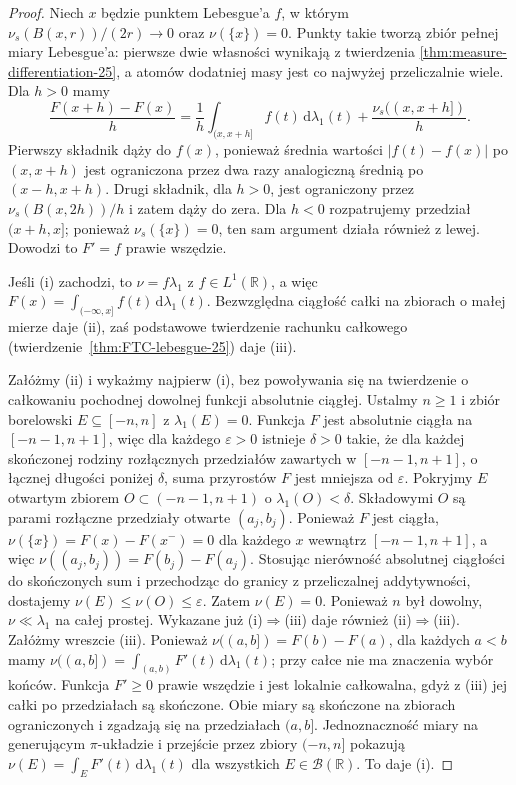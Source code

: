 \documentclass[11pt,a4paper,oneside]{book}
\numberwithin{equation}{chapter}
\theoremstyle{plain}
\theoremstyle{definition}
\theoremstyle{remark}
\begin{document}
\begin{proof}
Niech $x$ będzie punktem Lebesgue'a $f$, w którym
$\nu_s(B(x,r))/(2r)\to0$ oraz $\nu(\{x\})=0$.
Punkty takie tworzą zbiór pełnej miary Lebesgue'a:
pierwsze dwie własności wynikają z twierdzenia
\ref{thm:measure-differentiation-25}, a atomów dodatniej
masy jest co najwyżej przeliczalnie wiele.
Dla $h>0$ mamy
\[
 \frac{F(x+h)-F(x)}h
 =\frac1h\int_{(x,x+h]}f(t)\,\mathrm d\lambda_1(t)
 +\frac{\nu_s((x,x+h])}h.
\]
Pierwszy składnik dąży do $f(x)$, ponieważ średnia
wartości $|f(t)-f(x)|$ po $(x,x+h)$ jest ograniczona
przez dwa razy analogiczną średnią po $(x-h,x+h)$.
Drugi składnik, dla $h>0$, jest ograniczony przez
$\nu_s(B(x,2h))/h$ i zatem dąży do zera.
Dla $h<0$ rozpatrujemy przedział $(x+h,x]$;
ponieważ $\nu_s(\{x\})=0$, ten sam argument działa
również z lewej. Dowodzi to $F'=f$ prawie wszędzie.

Jeśli (i) zachodzi, to $\nu=f\lambda_1$ z
$f\in L^1(\mathbb R)$, a więc
$F(x)=\int_{(-\infty,x]}f(t)\,\mathrm d\lambda_1(t)$.
Bezwzględna ciągłość całki na zbiorach o małej mierze
daje (ii), zaś podstawowe twierdzenie rachunku
całkowego (twierdzenie~\ref{thm:FTC-lebesgue-25})
daje (iii).

Załóżmy (ii) i wykażmy najpierw (i), bez powoływania
się na twierdzenie o całkowaniu pochodnej dowolnej funkcji
absolutnie ciągłej. Ustalmy $n\ge1$ i zbiór borelowski
$E\subseteq[-n,n]$ z $\lambda_1(E)=0$. Funkcja $F$
jest absolutnie ciągła na $[-n-1,n+1]$, więc dla
każdego $\varepsilon>0$ istnieje $\delta>0$ takie,
że dla każdej skończonej rodziny rozłącznych przedziałów
zawartych w $[-n-1,n+1]$, o łącznej długości poniżej
$\delta$, suma przyrostów $F$ jest mniejsza od
$\varepsilon$. Pokryjmy $E$ otwartym zbiorem
$O\subset(-n-1,n+1)$ o $\lambda_1(O)<\delta$.
Składowymi $O$ są parami rozłączne przedziały otwarte
$(a_j,b_j)$. Ponieważ $F$ jest ciągła,
$\nu(\{x\})=F(x)-F(x^-)=0$ dla każdego $x$
wewnątrz $[-n-1,n+1]$, a więc
$\nu((a_j,b_j))=F(b_j)-F(a_j)$.
Stosując nierówność absolutnej ciągłości do skończonych
sum i przechodząc do granicy z przeliczalnej addytywności,
dostajemy $\nu(E)\le\nu(O)\le\varepsilon$.
Zatem $\nu(E)=0$. Ponieważ $n$ był dowolny,
$\nu\ll\lambda_1$ na całej prostej. Wykazane już
(i)$\Rightarrow$(iii) daje również (ii)$\Rightarrow$(iii).
Załóżmy wreszcie (iii). Ponieważ
$\nu((a,b])=F(b)-F(a)$, dla każdych $a<b$ mamy
$\nu((a,b])=\int_{(a,b)}F'(t)\,\mathrm d\lambda_1(t)$;
przy całce nie ma znaczenia wybór końców.
Funkcja $F'\ge0$ prawie wszędzie i jest lokalnie
całkowalna, gdyż z (iii) jej całki po przedziałach
są skończone. Obie miary są skończone na zbiorach
ograniczonych i zgadzają się na przedziałach $(a,b]$.
Jednoznaczność miary na generującym $\pi$-układzie
i przejście przez zbiory $(-n,n]$ pokazują
$\nu(E)=\int_EF'(t)\,\mathrm d\lambda_1(t)$
dla wszystkich $E\in\mathcal B(\mathbb R)$.
To daje (i).
\end{proof}
\end{document}
